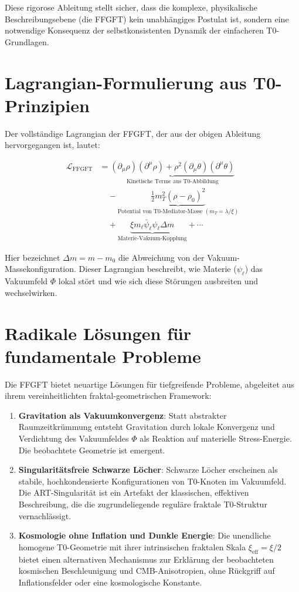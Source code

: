	Diese rigorose Ableitung stellt sicher, dass die komplexe, physikalische Beschreibungsebene (die FFGFT) kein unabhängiges Postulat ist, sondern eine notwendige Konsequenz der selbstkonsistenten Dynamik der einfacheren T0-Grundlagen.
	
	\section{Lagrangian-Formulierung aus T0-Prinzipien}
	
	Der vollständige Lagrangian der FFGFT, der aus der obigen Ableitung hervorgegangen ist, lautet:
	
	\begin{align}
		\mathcal{L}_{\text{FFGFT}} &= \underbrace{(\partial_\mu \rho)(\partial^\mu \rho) + \rho^2 (\partial_\mu \theta)(\partial^\mu \theta)}_{\text{Kinetische Terme aus T0-Abbildung}} \\
		&\quad - \underbrace{\frac{1}{2} m_T^2 (\rho - \rho_0)^2}_{\text{Potential von T0-Mediator-Masse } (m_T = \lambda / \xi)} \\
		&\quad + \underbrace{\xi m_\ell \bar{\psi}_\ell \psi_\ell \Delta m}_{\text{Materie-Vakuum-Kopplung}} + \cdots
	\end{align}
	
	Hier bezeichnet $\Delta m = m - m_0$ die Abweichung von der Vakuum-Massekonfiguration. Dieser Lagrangian beschreibt, wie Materie ($\psi_\ell$) das Vakuumfeld $\Phi$ lokal stört und wie sich diese Störungen ausbreiten und wechselwirken.
	
	\section{Radikale Lösungen für fundamentale Probleme}
	
	Die FFGFT bietet neuartige Lösungen für tiefgreifende Probleme, abgeleitet aus ihrem vereinheitlichten fraktal-geometrischen Framework:
	
	\begin{enumerate}
		\item \textbf{Gravitation als Vakuumkonvergenz}: Statt abstrakter Raumzeitkrümmung entsteht Gravitation durch lokale Konvergenz und Verdichtung des Vakuumfeldes $\Phi$ als Reaktion auf materielle Stress-Energie. Die beobachtete Geometrie ist emergent.
		\item \textbf{Singularitätsfreie Schwarze Löcher}: Schwarze Löcher erscheinen als stabile, hochkondensierte Konfigurationen von T0-Knoten im Vakuumfeld. Die ART-Singularität ist ein Artefakt der klassischen, effektiven Beschreibung, die die zugrundeliegende reguläre fraktale T0-Struktur vernachlässigt.
		\item \textbf{Kosmologie ohne Inflation und Dunkle Energie}: Die unendliche homogene T0-Geometrie mit ihrer intrinsischen fraktalen Skala $\xi_{\text{eff}} = \xi/2$ bietet einen alternativen Mechanismus zur Erklärung der beobachteten kosmischen Beschleunigung und CMB-Anisotropien, ohne Rückgriff auf Inflationsfelder oder eine kosmologische Konstante.
	\end{enumerate}
	
